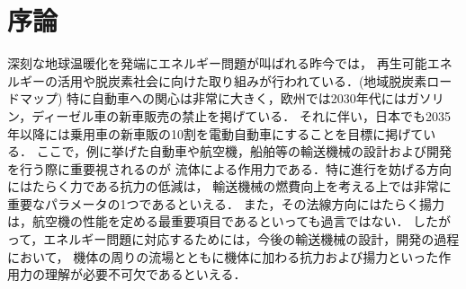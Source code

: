 
\section{序論}

深刻な地球温暖化を発端にエネルギー問題が叫ばれる昨今では，
再生可能エネルギーの活用や脱炭素社会に向けた取り組みが行われている．(地域脱炭素ロードマップ)
特に自動車への関心は非常に大きく，欧州では2030年代にはガソリン，ディーゼル車の新車販売の禁止を掲げている．
それに伴い，日本でも2035年以降には乗用車の新車販の10割を電動自動車にすることを目標に掲げている．
ここで，例に挙げた自動車や航空機，船舶等の輸送機械の設計および開発を行う際に重要視されるのが
流体による作用力である．特に進行を妨げる方向にはたらく力である抗力の低減は，
輸送機械の燃費向上を考える上では非常に重要なパラメータの1つであるといえる．
また，その法線方向にはたらく揚力は，航空機の性能を定める最重要項目であるといっても過言ではない．
したがって，エネルギー問題に対応するためには，今後の輸送機械の設計，開発の過程において，
機体の周りの流場とともに機体に加わる抗力および揚力といった作用力の理解が必要不可欠であるといえる．